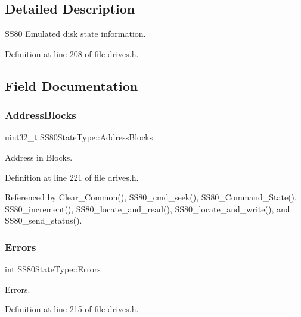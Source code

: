 \subsection{Detailed Description}
S\+S80 Emulated disk state information. 

Definition at line 208 of file drives.\+h.



\subsection{Field Documentation}
\mbox{\label{structSS80StateType_a6cffa1e36a57bce4188ede4bd9dbd7ad}} 
\subsubsection{\texorpdfstring{Address\+Blocks}{AddressBlocks}}
{\footnotesize\ttfamily uint32\+\_\+t S\+S80\+State\+Type\+::\+Address\+Blocks}



Address in Blocks. 



Definition at line 221 of file drives.\+h.



Referenced by Clear\+\_\+\+Common(), S\+S80\+\_\+cmd\+\_\+seek(), S\+S80\+\_\+\+Command\+\_\+\+State(), S\+S80\+\_\+increment(), S\+S80\+\_\+locate\+\_\+and\+\_\+read(), S\+S80\+\_\+locate\+\_\+and\+\_\+write(), and S\+S80\+\_\+send\+\_\+status().

\mbox{\label{structSS80StateType_a7a5c363c6f617ee457a4daacadb3a7b2}} 
\subsubsection{\texorpdfstring{Errors}{Errors}}
{\footnotesize\ttfamily int S\+S80\+State\+Type\+::\+Errors}



Errors. 



Definition at line 215 of file drives.\+h.




